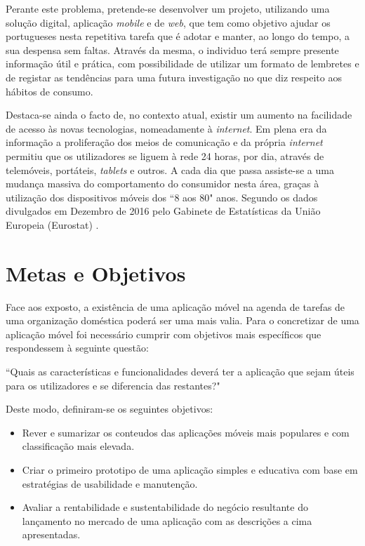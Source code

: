Perante este problema, pretende-se desenvolver um projeto, utilizando uma solução digital, aplicação \textit{mobile} e de \textit{web}, que tem como objetivo ajudar os portugueses nesta repetitiva tarefa que é adotar e manter, ao longo do tempo, a sua despensa sem faltas.
Através da mesma, o individuo terá sempre presente informação útil e prática, com possibilidade de utilizar um formato de lembretes e de registar as tendências para uma futura investigação no que diz respeito aos hábitos de consumo.

Destaca-se ainda o facto de, no contexto atual, existir um aumento na facilidade de acesso às novas tecnologias, nomeadamente à \textit{internet}. Em plena era da informação a proliferação dos meios de comunicação e da própria \textit{internet} permitiu que os utilizadores se liguem à rede 24 horas, por dia, através de telemóveis, portáteis, \textit{tablets} e outros. A cada dia que passa assiste-se a uma mudança massiva do comportamento do consumidor nesta área, graças à utilização dos dispositivos móveis dos ``8 aos 80" anos. Segundo os dados divulgados em Dezembro de 2016 pelo Gabinete de Estatísticas da União Europeia (Eurostat) \cite{eurostat:internetAccess2016}.

%
%
\section{Metas e Objetivos} \label{sec12}
Face aos exposto, a existência de uma aplicação móvel na agenda de tarefas de uma organização doméstica poderá ser uma mais valia. Para o concretizar de uma aplicação móvel foi necessário cumprir com objetivos mais específicos que respondessem à seguinte questão: 

``Quais as características e funcionalidades deverá ter a aplicação que sejam úteis para os utilizadores e se diferencia das restantes?"

Deste modo, definiram-se os seguintes objetivos:
\begin{itemize} \itemsep 0pt
	\item Rever e sumarizar os conteudos das aplicações móveis mais populares e com classificação mais elevada.
	\item Criar o primeiro prototipo de uma aplicação simples e educativa com base em estratégias de usabilidade e manutenção.
	\item Avaliar a rentabilidade e sustentabilidade do negócio resultante do lançamento no mercado de uma aplicação com as descrições a cima apresentadas.
\end{itemize}

